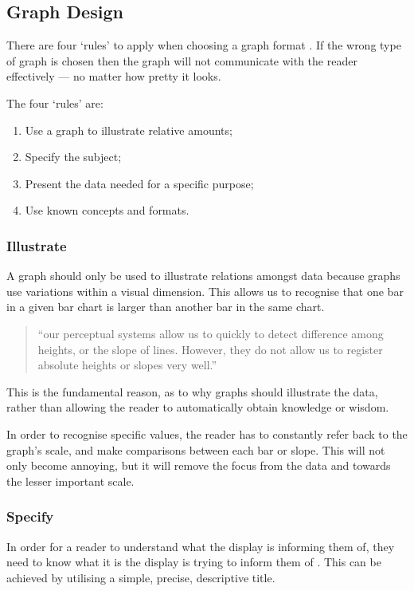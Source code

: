 \subsection{Graph Design}

There are four `rules' to apply when choosing a graph format \citep{kosslyn06}.
If the wrong type of graph is chosen then the graph will not communicate with 
the reader effectively --- no matter how pretty it looks. 

The four `rules' are:
\begin{enumerate}
  \item Use a graph to illustrate relative amounts;
  \item Specify the subject;
  \item Present the data needed for a specific purpose;
  \item Use known concepts and formats.
\end{enumerate}


\subsubsection*{Illustrate}
A graph should only be used to illustrate relations amongst data 
\citep{kosslyn06} because graphs use variations within a visual dimension. This
allows us to recognise that one bar in a given bar chart is larger than another
bar in the same chart. 

\begin{quote}
  ``our perceptual systems allow us to quickly to detect difference among 
  heights, or the slope of lines. However, they do not allow us to register 
  absolute heights or slopes very well.'' \citep{kosslyn06}
\end{quote}

This is the fundamental reason, as to why graphs should illustrate the data, 
rather than allowing the reader to automatically obtain knowledge or wisdom.

In order to recognise specific values, the reader has to constantly refer back 
to the graph's scale, and make comparisons between each bar or slope. This 
will not only become annoying, but it will remove the focus from the data and 
towards the lesser important scale.


\subsubsection*{Specify}
In order for a reader to understand what the display is informing them of, they
need to know what it is the display is trying to inform them of 
\citep{kosslyn06}. This can be achieved by utilising a simple, precise, 
descriptive title.

